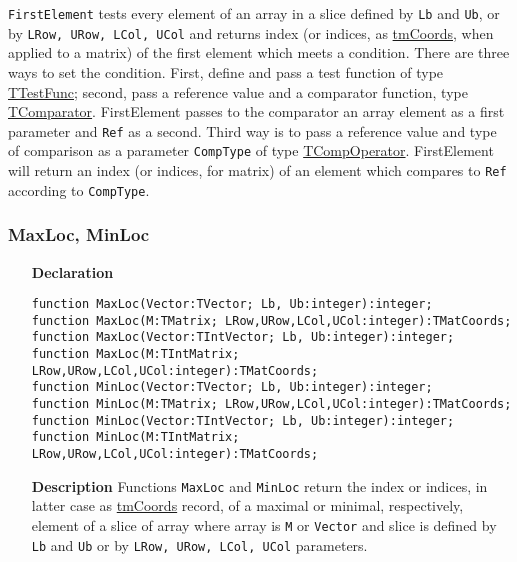 \documentclass[12pt,a4paper,oneside]{report}
\newcommand{\declarationitem}[1]{\textbf{#1}}
\newcommand{\descriptiontitle}[1]{\textbf{#1}}
\newcommand{\code}[1]{\texttt{#1}}
\begin{document}
\begin{itemize}
	\code{FirstElement} tests every element of an array in a slice defined by \code{Lb} and \code{Ub}, or by \code{LRow, URow, LCol, UCol} and returns index (or indices, as \hyperref[uvecutils:tmcoords]{tmCoords}, when applied to a matrix) of the first element which meets a condition. There are three ways to set the condition. First, define and pass a test function of type \hyperref[uvecutils:ttestfunc]{TTestFunc}; second, pass a reference value and a comparator function, type \hyperref[utypes-TComparator]{TComparator}. FirstElement passes to the comparator an array element as a first parameter and \code{Ref} as a second. Third way is to pass a reference value and type of comparison as a parameter \code{CompType} of type \hyperref[utypes-TCompOperator]{TCompOperator}. FirstElement will return an index (or indices, for matrix) of an element which compares to \code{Ref} according to \code{CompType}. 
\end{itemize}

\subsubsection{MaxLoc, MinLoc}
\begin{itemize}
	\item[\declarationitem{Declaration}\hfill]
\begin{flushleft}	\code{function MaxLoc(Vector:TVector; Lb, Ub:integer):integer;\\ \vspace{4pt}
	function MaxLoc(M:TMatrix; LRow,URow,LCol,UCol:integer):TMatCoords;\\ \vspace{4pt}
	function MaxLoc(Vector:TIntVector; Lb, Ub:integer):integer;\\ \vspace{4pt}
	function MaxLoc(M:TIntMatrix; LRow,URow,LCol,UCol:integer):TMatCoords;\\ \vspace{12pt}
	function MinLoc(Vector:TVector; Lb, Ub:integer):integer;\\ \vspace{4pt}
	function MinLoc(M:TMatrix; LRow,URow,LCol,UCol:integer):TMatCoords;\\ \vspace{4pt}
	function MinLoc(Vector:TIntVector; Lb, Ub:integer):integer;\\ \vspace{4pt}
	function MinLoc(M:TIntMatrix; LRow,URow,LCol,UCol:integer):TMatCoords;}
\end{flushleft}	
\item[\descriptiontitle{Description}]
	Functions \code{MaxLoc} and \code{MinLoc} return the index or indices, in latter case as \hyperref[uvecutils:tmcoords]{tmCoords} record, of a maximal or minimal, respectively, element of a slice of array where array is \code{M} or \code{Vector} and slice is defined by \code{Lb} and \code{Ub} or by \code{LRow, URow, LCol, UCol} parameters. 
\end{itemize}
\end{document}
